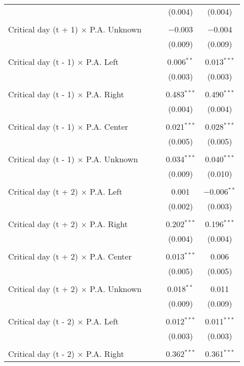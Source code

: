 \documentclass[
]{article}
\begin{document}
\begin{table}[!htbp]
{\begin{tabular}{@{\extracolsep{5pt}}lcccc}
  &  &  & (0.004) & (0.004) \\ 
  & & & & \\ 
 Critical day (t + 1) $\times$ P.A. Unknown &  &  & $-$0.003 & $-$0.004 \\ 
  &  &  & (0.009) & (0.009) \\ 
  & & & & \\ 
 Critical day (t - 1) $\times$ P.A. Left &  &  & 0.006$^{**}$ & 0.013$^{***}$ \\ 
  &  &  & (0.003) & (0.003) \\ 
  & & & & \\ 
 Critical day (t - 1) $\times$ P.A. Right &  &  & 0.483$^{***}$ & 0.490$^{***}$ \\ 
  &  &  & (0.004) & (0.004) \\ 
  & & & & \\ 
 Critical day (t - 1) $\times$ P.A. Center &  &  & 0.021$^{***}$ & 0.028$^{***}$ \\ 
  &  &  & (0.005) & (0.005) \\ 
  & & & & \\ 
 Critical day (t - 1) $\times$ P.A. Unknown &  &  & 0.034$^{***}$ & 0.040$^{***}$ \\ 
  &  &  & (0.009) & (0.010) \\ 
  & & & & \\ 
 Critical day (t + 2) $\times$ P.A. Left &  &  & 0.001 & $-$0.006$^{**}$ \\ 
  &  &  & (0.002) & (0.003) \\ 
  & & & & \\ 
 Critical day (t + 2) $\times$ P.A. Right &  &  & 0.202$^{***}$ & 0.196$^{***}$ \\ 
  &  &  & (0.004) & (0.004) \\ 
  & & & & \\ 
 Critical day (t + 2) $\times$ P.A. Center &  &  & 0.013$^{***}$ & 0.006 \\ 
  &  &  & (0.005) & (0.005) \\ 
  & & & & \\ 
 Critical day (t + 2) $\times$ P.A. Unknown &  &  & 0.018$^{**}$ & 0.011 \\ 
  &  &  & (0.009) & (0.009) \\ 
  & & & & \\ 
 Critical day (t - 2) $\times$ P.A. Left &  &  & 0.012$^{***}$ & 0.011$^{***}$ \\ 
  &  &  & (0.003) & (0.003) \\ 
  & & & & \\ 
 Critical day (t - 2) $\times$ P.A. Right &  &  & 0.362$^{***}$ & 0.361$^{***}$ \\ 

\end{tabular}}
\end{table}
\end{document}
